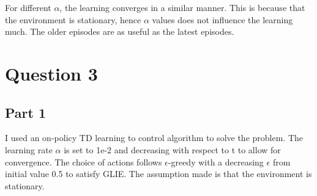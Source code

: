 \documentclass{article}
\begin{document}
    For different $\alpha$, the learning converges in a similar manner.
    This is because that the environment is stationary, hence $\alpha$ values does not influence the learning much.
    The older episodes are as useful as the latest episodes.


    \section{Question 3}\label{sec:question-3}

    \subsection{Part 1}\label{subsec:question-3-1}
    I used an on-policy TD learning to control algorithm to solve the problem.
    The learning rate $\alpha$ is set to 1e-2 and decreasing with respect to t to allow for convergence.
    The choice of actions follows $\epsilon$-greedy with a decreasing $\epsilon$ from initial value 0.5 to satisfy GLIE.
    The assumption made is that the environment is stationary.
\end{document}
